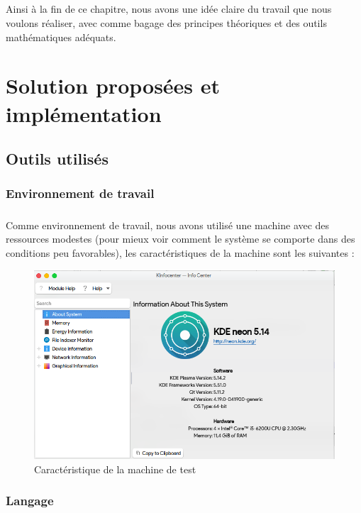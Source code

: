 \documentclass[12pt]{report}
\begin{document}
	\paragraph{}
	Ainsi à la fin de ce chapitre, nous avons une idée claire du travail que nous voulons réaliser, avec comme bagage des 
	principes théoriques et des outils mathématiques adéquats.
\chapter{Solution proposées et implémentation}

	\section{Outils utilisés}
	
		\subsection{Environnement de travail}
		\paragraph{}
		Comme environnement de travail, nous avons utilisé une machine avec des ressources modestes (pour mieux
		voir comment le système se comporte dans des conditions peu favorables), les caractéristiques de la 
		machine sont les suivantes :
		
		\begin{figure}[H]
			\centering
			\includegraphics[scale=0.75]{imgs/machineA.png}
			\caption{Caractéristique de la machine de test}
			\label{fig:maxhineA}
		\end{figure}
		
		\subsection{Langage}
\end{document}
